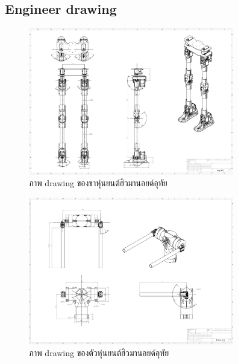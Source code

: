 \clearpage
\subsection{Engineer drawing}

\begin{figure}[!ht]
  \centering
  \includegraphics[width=0.8\textwidth]{chapter4/images/uthai_drawing_leg.png}
  \caption{ภาพ drawing ของขาหุ่นยนต์ฮิวมานอยด์อุทัย}
  \label{fig:uthai_drawing_leg}
\end{figure}
\begin{figure}[!ht]
  \centering
  \includegraphics[width=0.8\textwidth]{chapter4/images/uthai_drawing_body.png}
  \caption{ภาพ drawing ของตัวหุ่นยนต์ฮิวมานอยด์อุทัย}
  \label{fig:uthai_drawing_body}
\end{figure}